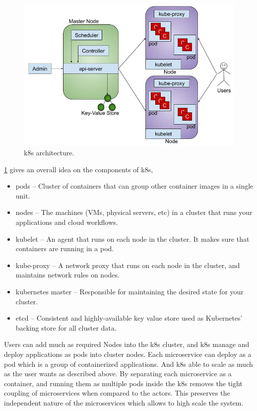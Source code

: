 \begin{figure}[htp]
    \centering
    \includegraphics[width=1\textwidth]{method/microservice/k8s_architecture_v3.jpg}
    \caption{\acrfull{k8s} architecture.}
    \label{fi:k8s_architecture}
\end{figure}
\cref{fi:k8s_architecture} gives an overall idea on the components of \acrshort{k8s},
\begin{itemize}
    \item pods -- Cluster of containers that can group other container images in a single unit.
    \item nodes -- The machines (VMs, physical servers, etc) in a cluster that runs your applications and cloud workflows.
    \item kubelet -- An agent that runs on each node in the cluster. It makes sure that containers are running in a pod.
    \item kube-proxy -- A network proxy that runs on each node in the cluster, and maintains network rules on nodes.
    \item kubernetes master -- Responsible for maintaining the desired state for your cluster.
    \item etcd -- Consistent and highly-available key value store used as Kubernetes’ backing store for all cluster data.
\end{itemize}

Users can add much as required Nodes into the \acrshort{k8s} cluster, and \acrshort{k8s} manage and deploy applications as pods into cluster nodes.
Each microservice can deploy as a pod which is a group of containerized applications. And \acrshort{k8s} able to scale as much as the user wants as described above.
By separating each microservice as a container, and running them as multiple pods inside the \acrshort{k8s} removes the tight coupling of microservices when compared to the actors. This preserves the independent nature of the microservices which allows to high scale the system.

